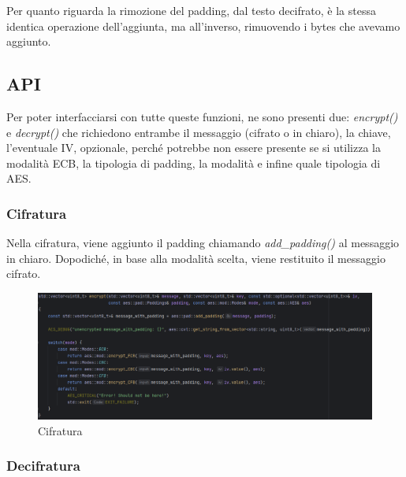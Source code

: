 
\textsf{\small Per quanto riguarda la rimozione del padding, dal testo decifrato, è la stessa identica operazione dell'aggiunta, ma all'inverso, rimuovendo i bytes che avevamo aggiunto.} 

\subsection{API}

   

\textsf{\small Per poter interfacciarsi con tutte queste funzioni, ne sono presenti due: \emph{encrypt()} e \emph{decrypt()} che richiedono entrambe il messaggio (cifrato o in chiaro), la chiave, l'eventuale IV, opzionale, perché potrebbe non essere presente se si utilizza la modalità ECB, la tipologia di padding, la modalità e infine quale tipologia di AES.}

\subsubsection{Cifratura}


\textsf{\small Nella cifratura, viene aggiunto il padding chiamando \emph{add\_padding()} al messaggio in chiaro. Dopodiché, in base alla modalità scelta, viene restituito il messaggio cifrato.}

\begin{figure}[H]
	\centering
	\includegraphics[width=1\textwidth, height=1\textheight, keepaspectratio]{./images/code/cpp/api/encrypt.PNG}
	\caption{Cifratura}
	\label{fig:encrypt}
\end{figure}


\subsubsection{Decifratura}

